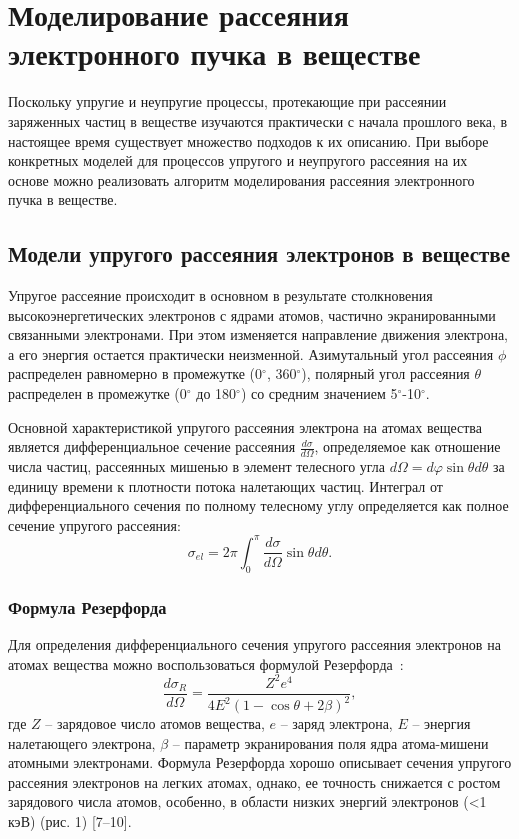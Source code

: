 \section{Моделирование рассеяния электронного пучка в веществе}

Поскольку упругие и неупругие процессы, протекающие при рассеянии заряженных частиц в веществе изучаются практически с начала прошлого века, в настоящее время существует множество подходов к их описанию. При выборе конкретных моделей для процессов упругого и неупругого рассеяния на их основе можно реализовать алгоритм моделирования рассеяния электронного пучка в веществе.

\subsection{Модели упругого рассеяния электронов в веществе}
Упругое рассеяние происходит в основном в результате столкновения высокоэнергетических электронов с ядрами атомов, частично экранированными связанными электронами. При этом изменяется направление движения электрона, а его энергия остается практически неизменной. Азимутальный угол рассеяния $\phi$ распределен равномерно в промежутке (0$^\circ$, 360$^\circ$), полярный угол рассеяния $\theta$ распределен в промежутке (0$^\circ$ до 180$^\circ$) со средним значением 5$^\circ$-10$^\circ$.

Основной характеристикой упругого рассеяния электрона на атомах вещества является дифференциальное сечение рассеяния $\frac{d \sigma}{d \Omega}$, определяемое как отношение числа частиц, рассеянных мишенью в элемент телесного угла $d \Omega = d \varphi \sin \theta d \theta$ за единицу времени к плотности потока налетающих частиц. Интеграл от дифференциального сечения по полному телесному углу определяется как полное сечение упругого рассеяния:
\begin{equation} \label{eq:models_1}
	\sigma_{el}=2 \pi \int_0^\pi \frac{d \sigma}{d \Omega} \sin \theta d \theta.
\end{equation}

\subsubsection{Формула Резерфорда}
Для определения дифференциального сечения упругого рассеяния электронов на атомах вещества можно воспользоваться формулой Резерфорда~\cite{Dapor_large_book}:
\begin{equation} \label{eq:models_3}
	\frac{d \sigma_R}{d \Omega}=\frac{Z^2 e^4}{4 E^2(1-\cos \theta+2 \beta)^2},
\end{equation}
где $Z$ -- зарядовое число атомов вещества, $e$ -- заряд электрона, $E$ -- энергия налетающего электрона, $\beta$ -- параметр экранирования поля ядра атома-мишени атомными электронами. Формула Резерфорда хорошо описывает сечения упругого рассеяния электронов на легких атомах, однако, ее точность снижается с ростом зарядового числа атомов, особенно, в области низких энергий электронов (<1 кэВ) (рис. 1) [7–10].

